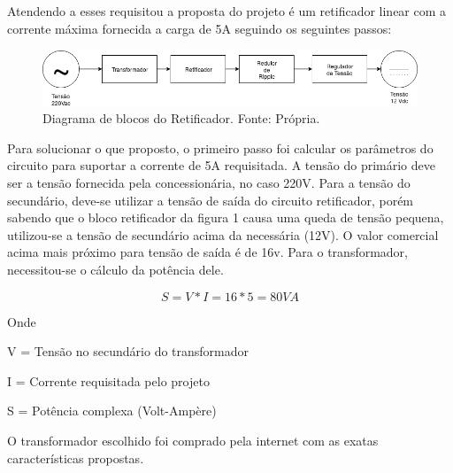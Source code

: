         Atendendo a esses requisitou a proposta do projeto é um retificador linear com 				a corrente máxima fornecida a carga de 5A seguindo os seguintes passos:
        
        \begin{figure}[!htb]
            \centering
            \includegraphics[scale= 0.5]{figuras/Diagrama_Retificador.png}
            \caption{Diagrama de blocos do Retificador. Fonte: Própria.}
            \label{diagrama-retificador}
        \end{figure}
        
        Para solucionar o que proposto, o primeiro passo foi calcular os parâmetros do 				circuito para suportar a corrente de 5A requisitada. A tensão do primário deve 				ser a tensão fornecida pela concessionária, no caso 220V. Para a tensão do 						secundário, deve-se utilizar a tensão de saída do circuito retificador, porém 					sabendo que o bloco retificador da figura 1 causa uma queda de tensão pequena, 				utilizou-se a tensão de secundário acima da necessária (12V). O valor 							comercial acima mais próximo para tensão de saída é de 16v. Para o 								transformador, necessitou-se o cálculo da potência dele.

            \begin{equation}
            S = V*I = 16*5 = 80VA
        \end{equation}
        
        Onde
        
        V = Tensão no secundário do transformador
        
        I = Corrente requisitada pelo projeto
        
        S = Potência complexa (Volt-Ampère)

        O transformador escolhido foi comprado pela internet com as exatas 								características propostas.


